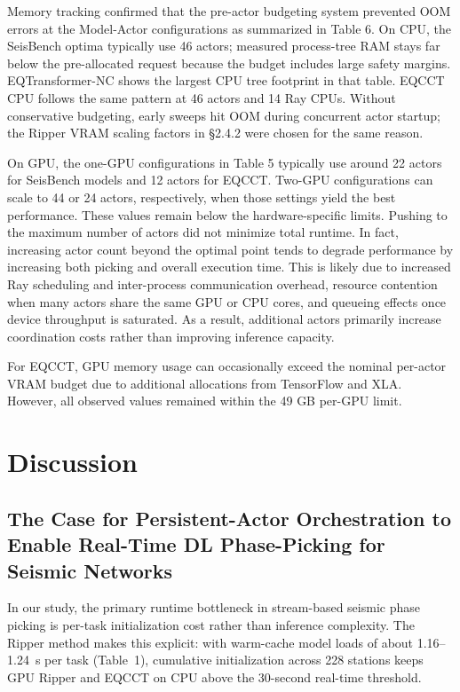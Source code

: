Memory tracking confirmed that the pre-actor budgeting system prevented OOM errors at the Model-Actor configurations as summarized in Table 6. On CPU, the SeisBench optima typically use 46 actors; measured process-tree RAM stays far below the pre-allocated request because the budget includes large safety margins. EQTransformer-NC shows the largest CPU tree footprint in that table. EQCCT CPU follows the same pattern at 46 actors and 14 Ray CPUs. Without conservative budgeting, early sweeps hit OOM during concurrent actor startup; the Ripper VRAM scaling factors in \S2.4.2 were chosen for the same reason.

On GPU, the one-GPU configurations in Table 5 typically use around 22 actors for SeisBench models and 12 actors for EQCCT. Two-GPU configurations can scale to 44 or 24 actors, respectively, when those settings yield the best performance. These values remain below the hardware-specific limits. Pushing to the maximum number of actors did not minimize total runtime. In fact, increasing actor count beyond the optimal point tends to degrade performance by increasing both picking and overall execution time. This is likely due to increased Ray scheduling and inter-process communication overhead, resource contention when many actors share the same GPU or CPU cores, and queueing effects once device throughput is saturated. As a result, additional actors primarily increase coordination costs rather than improving inference capacity.

For EQCCT, GPU memory usage can occasionally exceed the nominal per-actor VRAM budget due to additional allocations from TensorFlow and XLA. However, all observed values remained within the 49 GB per-GPU limit.

\section{Discussion}

\subsection{The Case for Persistent-Actor Orchestration to Enable Real-Time DL Phase-Picking for Seismic Networks}

In our study, the primary runtime bottleneck in stream-based seismic phase picking is per-task initialization cost rather than inference complexity. The Ripper method makes this explicit: with warm-cache model loads of about 1.16--1.24~s per task (Table~1), cumulative initialization across 228 stations keeps GPU Ripper and EQCCT on CPU above the 30-second real-time threshold.

